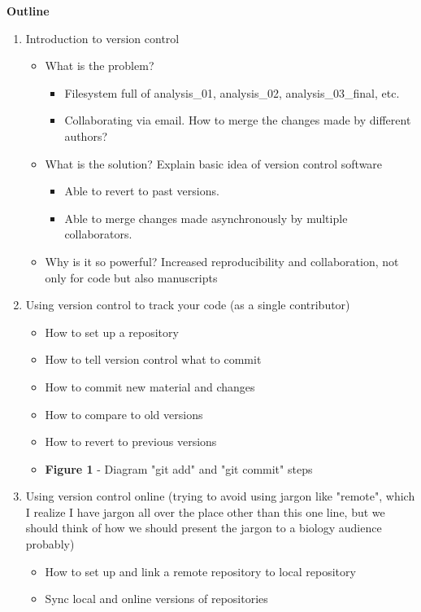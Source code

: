 \textbf{Outline}

\begin{enumerate}
  \item Introduction to version control
  \begin{itemize}
    \item What is the problem?
    \begin{itemize}
      \item Filesystem full of analysis\_01, analysis\_02, analysis\_03\_final, etc.
      \item Collaborating via email. How to merge the changes made by different authors?
    \end{itemize}
    \item What is the solution? Explain basic idea of version control software
    \begin{itemize}
      \item Able to revert to past versions.
      \item Able to merge changes made asynchronously by multiple collaborators.
    \end{itemize}
    \item Why is it so powerful? Increased reproducibility and collaboration, not only for code but also manuscripts \cite{23448176}
\end{itemize}
  \item Using version control to track your code (as a single contributor)
  \begin{itemize}
    \item How to set up a repository
    \item How to tell version control what to commit
    \item How to commit new material and changes
    \item How to compare to old versions
    \item How to revert to previous versions
    \item \textbf{Figure 1} - Diagram "git add" and "git commit" steps
  \end{itemize}
  \item Using version control online (trying to avoid using jargon like "remote", which I realize I have jargon all over the place other than this one line, but we should think of how we should present the jargon to a biology audience probably)
  \begin{itemize}
    \item How to set up and link a remote repository to local repository
    \item Sync local and online versions of repositories

\end{itemize}
\end{enumerate}
